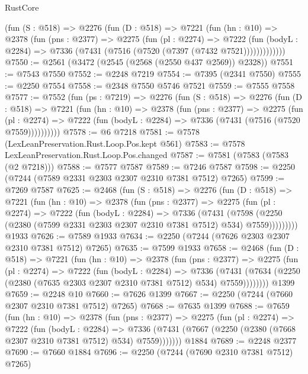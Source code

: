 \begin{lexlean}{RustCore}
\begin{coremodule}
        (fun (S : @518) =>
        @2276
          (fun (D : @518) =>
          @7221
            (fun (hn : @10) =>
            @2378
              (fun (pns : @2377) =>
              @2275
                (fun (pl : @2274) =>
                @7222
                  (fun (bodyL : @2284) =>
                  @7336 (@7431 (@7516 (@7520 (@7397 (@7432 @7521)))))))))))))
@7550 := @2561 (@3472 (@2545 (@2568 (@2550 @437 @2569)) @2328))
@7551 := @7543 @7550
@7552 := @2248 @7219
@7554 := @7395 (@2341 @7550)
@7555 := @2250 @7554
@7558 := @2348 @7550 @5746 @7521
@7559 := @7555 @7558
@7577 := @7552
    (fun (ps : @7219) =>
    @2276
      (fun (S : @518) =>
      @2276
        (fun (D : @518) =>
        @7221
          (fun (hn : @10) =>
          @2378
            (fun (pns : @2377) =>
            @2275
              (fun (pl : @2274) =>
              @7222 (fun (bodyL : @2284) => @7336 (@7431 (@7516 (@7520 @7559))))))))))
@7578 := @6 @7218
@7581 := @7578 (LexLeanPreservation.Rust.Loop.Pos.kept @561)
@7583 := @7578 LexLeanPreservation.Rust.Loop.Pos.changed
@7587 := @7581 (@7583 (@7583 (@2 @7218)))
@7588 := @7577 @7587
@7589 := @7246 @7587
@7598 := @2250 (@7244 (@7589 @2331 @2303 @2307 @2310 @7381 @7512) @7265)
@7599 := @7269 @7587
@7625 := @2468
    (fun (S : @518) =>
    @2276
      (fun (D : @518) =>
      @7221
        (fun (hn : @10) =>
        @2378
          (fun (pns : @2377) =>
          @2275
            (fun (pl : @2274) =>
            @7222
              (fun (bodyL : @2284) =>
              @7336
                (@7431
                  (@7598
                    (@2250 (@2380 (@7599 @2331 @2303 @2307 @2310 @7381 @7512) @534) @7559)))))))))
    @1933
@7626 := @7589 @1933
@7634 := @2250 (@7244 (@7626 @2303 @2307 @2310 @7381 @7512) @7265)
@7635 := @7599 @1933
@7658 := @2468
    (fun (D : @518) =>
    @7221
      (fun (hn : @10) =>
      @2378
        (fun (pns : @2377) =>
        @2275
          (fun (pl : @2274) =>
          @7222
            (fun (bodyL : @2284) =>
            @7336
              (@7431 (@7634 (@2250 (@2380 (@7635 @2303 @2307 @2310 @7381 @7512) @534) @7559))))))))
    @1399
@7659 := @2248 @10
@7660 := @7626 @1399
@7667 := @2250 (@7244 (@7660 @2307 @2310 @7381 @7512) @7265)
@7668 := @7635 @1399
@7688 := @7659
    (fun (hn : @10) =>
    @2378
      (fun (pns : @2377) =>
      @2275
        (fun (pl : @2274) =>
        @7222
          (fun (bodyL : @2284) =>
          @7336 (@7431 (@7667 (@2250 (@2380 (@7668 @2307 @2310 @7381 @7512) @534) @7559)))))))
    @1884
@7689 := @2248 @2377
@7690 := @7660 @1884
@7696 := @2250 (@7244 (@7690 @2310 @7381 @7512) @7265)

\end{coremodule}
\end{lexlean}

